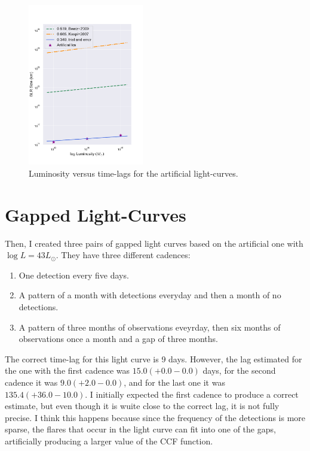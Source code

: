 \documentclass[letterpaper, oneside]{article}
\begin{document}
\begin{figure}[h]
	\centering
	\includegraphics[width=0.45\textwidth]{../other_plots/artificial_L_vs_timelag.pdf}
	\caption{Luminosity versus time-lags for the artificial light-curves.}
	\label{fig:art_lum_vs_lag}
\end{figure}


\section{Gapped Light-Curves}

Then, I created three pairs of gapped light curves based on the artificial one with $\log{L} = 43 L_{\odot}$. They have three different cadences:
\begin{enumerate}
	\item One detection every five days.
	
	\item A pattern of a month with detections everyday and then a month of no detections.
	
	\item A pattern of three months of observations eveyrday, then six months of observations once a month and a gap of three months.
	
\end{enumerate}

The correct time-lag for this light curve is 9 days. However, the lag estimated for the one with the first cadence was $15.0 (+ 0.0 - 0.0)$ days, for the second cadence it was $9.0 (+ 2.0 - 0.0)$, and for the last one it was $135.4 (+ 36.0 - 10.0)$. I initially expected the first cadence to produce a correct estimate, but even though it is wuite close to the correct lag, it is not fully precise. I think this happens because since the frequency of the detections is more sparse, the flares that occur in the light curve can fit into one of the gaps, artificially producing a larger value of the CCF function.
\end{document}
